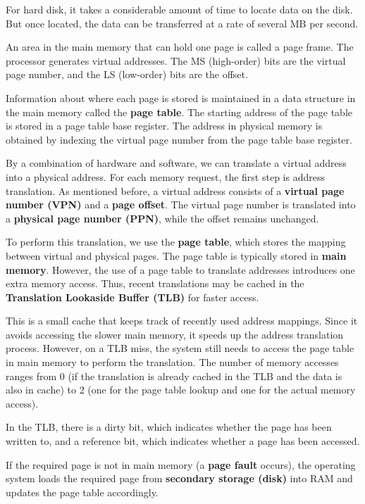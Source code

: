 For hard disk, it takes a considerable amount of time to locate data on the disk. But once located, the data can be transferred at a rate of several MB per second.

An area in the main memory that can hold one page is called a page frame. The processor generates virtual addresses. The MS (high-order) bits are the virtual page number, and the LS (low-order) bits are the offset.

Information about where each page is stored is maintained in a data structure in the main memory called the \textbf{page table}. The starting address of the page table is stored in a page table base register. The address in physical memory is obtained by indexing the virtual page number from the page table base register. 

By a combination of hardware and software, we can translate a virtual address into a physical address. For each memory request, the first step is address translation. As mentioned before, a virtual address consists of a \textbf{virtual page number (VPN)} and a \textbf{page offset}. The virtual page number is translated into a \textbf{physical page number (PPN)}, while the offset remains unchanged.

To perform this translation, we use the \textbf{page table}, which stores the mapping between virtual and physical pages. The page table is typically stored in \textbf{main memory}. However, the use of a page table to translate addresses introduces one extra memory access. Thus, recent translations may be cached in the \textbf{Translation Lookaside Buffer (TLB)} for faster access.

This is a small cache that keeps track of recently used address mappings. Since it avoids accessing the slower main memory, it speeds up the address translation process. However, on a TLB miss, the system still needs to access the page table in main memory to perform the translation. The number of memory accesses ranges from 0 (if the translation is already cached in the TLB and the data is also in cache) to 2 (one for the page table lookup and one for the actual memory access).

In the TLB, there is a dirty bit, which indicates whether the page has been written to, and a reference bit, which indicates whether a page has been accessed.

If the required page is not in main memory (a \textbf{page fault} occurs), the operating system loads the required page from \textbf{secondary storage (disk)} into RAM and updates the page table accordingly.

